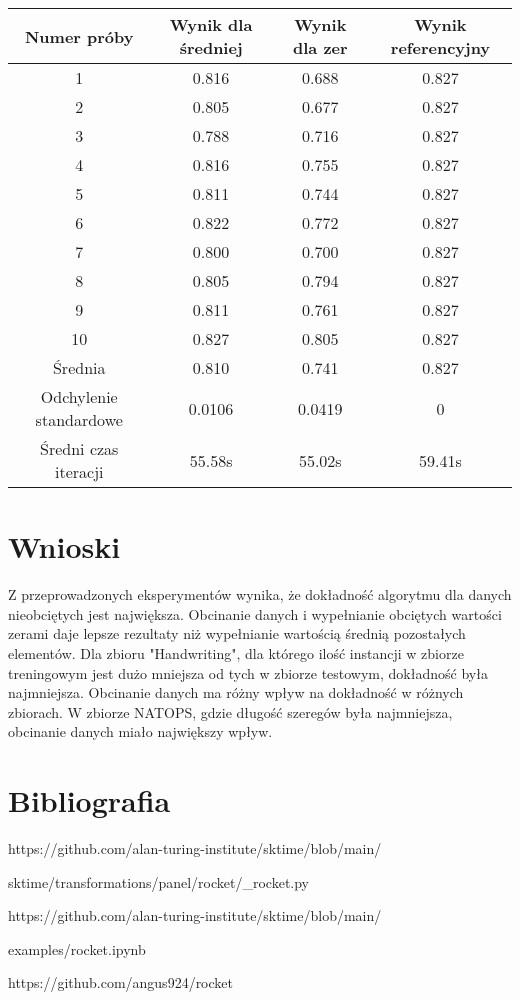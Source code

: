 \documentclass[12pt]{article}
\begin{document}
\begin{center}
\begin{tabular}{|c c c c|} 
 \hline
 Numer próby & Wynik dla średniej & Wynik dla zer & Wynik referencyjny \\ [0.5ex] 
 \hline\hline
 1 & 0.816 & 0.688 & 0.827 \\
 \hline
 2 & 0.805 & 0.677 & 0.827 \\
 \hline
 3 & 0.788 & 0.716 & 0.827 \\
 \hline
 4 & 0.816 & 0.755 & 0.827 \\
 \hline
  5 & 0.811 & 0.744 & 0.827 \\
 \hline
  6 & 0.822 & 0.772 & 0.827 \\
 \hline
  7 & 0.800 & 0.700 & 0.827 \\
 \hline
  8 & 0.805 & 0.794 & 0.827 \\
 \hline
  9 & 0.811 & 0.761 & 0.827 \\
 \hline
  10 & 0.827 & 0.805 & 0.827 \\
 \hline
 Średnia & 0.810 & 0.741 & 0.827 \\
 \hline
 Odchylenie standardowe & 0.0106 & 0.0419 & 0 \\
 \hline
 Średni czas iteracji & 55.58s & 55.02s & 59.41s \\
 \hline
\end{tabular}
\end{center}

\section{Wnioski}

Z przeprowadzonych eksperymentów wynika, że dokładność algorytmu dla danych nieobciętych jest największa. Obcinanie danych i wypełnianie obciętych wartości zerami daje lepsze rezultaty niż wypełnianie wartością średnią pozostałych elementów. Dla zbioru "Handwriting", dla którego ilość instancji w zbiorze treningowym jest dużo mniejsza od tych w zbiorze testowym, dokładność była najmniejsza. Obcinanie danych ma różny wpływ na dokładność w różnych zbiorach. W zbiorze NATOPS, gdzie długość szeregów była najmniejsza, obcinanie danych miało największy wpływ.

\section{Bibliografia}

\begingroup
\renewcommand{\section}[2]{}%
\begin{thebibliography}{9}

https://github.com/alan-turing-institute/sktime/blob/main/

sktime/transformations/panel/rocket/\_rocket.py

https://github.com/alan-turing-institute/sktime/blob/main/

examples/rocket.ipynb

https://github.com/angus924/rocket
\end{thebibliography}
\endgroup
\end{document}
